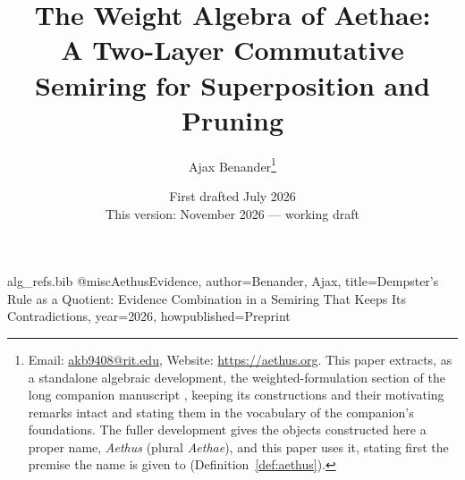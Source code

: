 \begin{filecontents}[overwrite]{alg_refs.bib}
@misc{AethusEvidence, author={Benander, Ajax}, title={Dempster's Rule as a Quotient: Evidence Combination in a Semiring That Keeps Its Contradictions}, year={2026}, howpublished={Preprint}}
\end{filecontents}
\documentclass[11pt]{article}
\usepackage[margin=0.75in]{geometry}
\usepackage{amsmath, amssymb, amsthm}
\usepackage[hidelinks]{hyperref}
\usepackage{microtype}
\usepackage[style=numeric, sorting=none]{biblatex}


\newtheorem{defin}{Definition}
\newtheorem{prop}{Proposition}
\newtheorem{lemma}{Lemma}
\newtheorem{theorem}{Theorem}
\newcommand{\Null}{\mathbf{1}}
\newcommand{\Hyp}{\mathbf{0}}

\title{The Weight Algebra of Aethae:\\ \large A Two-Layer Commutative Semiring for Superposition and Pruning}
\author{Ajax Benander\thanks{Email: \href{mailto:akb9408@rit.edu}{akb9408@rit.edu}, Website: \url{https://aethus.org}. This paper extracts, as a standalone algebraic development, the weighted-formulation section of the long companion manuscript \cite{Aethus}, keeping its constructions and their motivating remarks intact and stating them in the vocabulary of the companion's foundations. The fuller development gives the objects constructed here a proper name, \emph{Aethus} (plural \emph{Aethae}), and this paper uses it, stating first the premise the name is given to (Definition~\ref{def:aethus}).}}
\date{First drafted July 2026\\ {\small This version: November 2026 --- working draft}}

\usepackage{booktabs}

